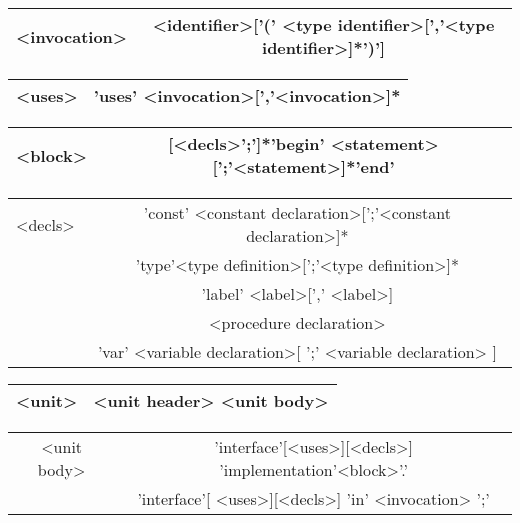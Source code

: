 {{\centering \begin{tabular}{|c|c|}
\hline
<invocation>&
<identifier>['(' <type identifier>{[}','<type identifier>{]*}')']\\
\hline
\end{tabular}\par}

\vspace{0.2cm}
{\centering \begin{tabular}{|c|c|}
\hline
<uses>&
'uses' <invocation>{[}','<invocation>{]}{*}\\
\hline
\end{tabular}\par}
\vspace{0.2cm}

\vspace{0.2cm}
{\centering \begin{tabular}{|c|c|}
\hline
\label{block}<block>&
{[}<decls>';'{]}{*}'begin' <statement>{[}';'<statement>{]}{*}'end'\\
\hline
\end{tabular}\par}
\vspace{0.3cm}


\vspace{0.2cm}
{\centering \begin{tabular}{|c|c|}
\hline
<decls>&
'const' <constant declaration>{[}';'<constant declaration>{]}{*}\\
&
'type'<type definition>{[}';'<type definition>{]}{*}\\
&
'label' <label>{[}',' <label>{]}\\
&
<procedure declaration>\\
&
'var' <variable declaration>{[} ';' <variable declaration> {]}\\
\hline
\end{tabular}\par}
\vspace{0.2cm}
\vspace{0.2cm}
{\centering \begin{tabular}{|c|c|}
\hline
<unit>&
<unit header> <unit body>\\

\hline
\end{tabular}\par}

\vspace{0.2cm}
{\centering \begin{tabular}{|c|c|}
\hline
<unit body>&
'interface'[<uses>][<decls>] 'implementation'<block>'.'\\&
'interface'[ <uses>][<decls>] 'in' <invocation> ';'\\


\end{tabular}}}
